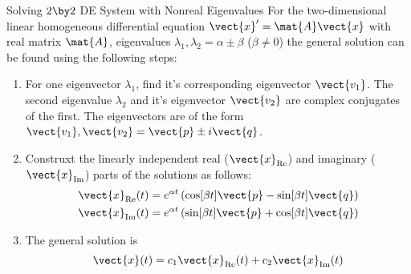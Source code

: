 \documentclass{beamer}
\newcommand{\xReal}{\vect{x}_{\text{Re}}}
\newcommand{\xImag}{\vect{x}_{\text{Im}}}
\begin{document}
\begin{frame}
\begin{block}{Solving $2\by 2$ DE System with Nonreal Eigenvalues}
For the two-dimensional linear homogeneous differential equation $\vect{x}^\prime=\mat{A}\vect{x}$ with real matrix $\mat{A}$, eigenvalues $\lambda_1,\lambda_2=\alpha\pm\beta$ ($\beta\neq 0$) the general solution can be found using the following steps:
\onslide<+->
\begin{enumerate}[<+- | alert@+>]
\item For one eigenvector $\lambda_1$, find it's corresponding eigenvector $\vect{v_1}$. The second eigenvalue $\lambda_2$ and it's eigenvector $\vect{v_2}$ are complex conjugates of the first. The eigenvectors are of the form $\vect{v_1},\vect{v_2}=\vect{p}\pm i\vect{q}$.
\item Construxt the linearly independent real ($\xReal$) and imaginary ($\xImag$) parts of the solutions as follows:
\begin{equation*}
\begin{aligned}
\xReal(t) &= e^{\alpha t}\left(\cos[\beta t]\vect{p}-\sin[\beta t]\vect{q} \right)\\
\xImag(t) &= e^{\alpha t}\left(\sin[\beta t]\vect{p}+\cos[\beta t]\vect{q} \right) \\
\end{aligned}
\end{equation*}
\item The general solution is
\begin{equation*}
\vect{x}(t)=c_1\xReal(t)+c_2\xImag(t)
\end{equation*}
\end{enumerate}
\end{block}
\end{frame}
\end{document}
